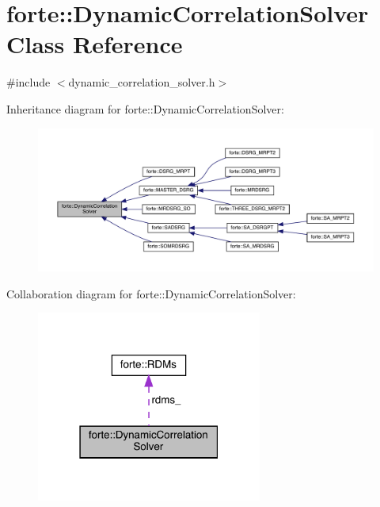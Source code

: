 \hypertarget{classforte_1_1_dynamic_correlation_solver}{}\section{forte\+:\+:Dynamic\+Correlation\+Solver Class Reference}
\label{classforte_1_1_dynamic_correlation_solver}


{\ttfamily \#include $<$dynamic\+\_\+correlation\+\_\+solver.\+h$>$}



Inheritance diagram for forte\+:\+:Dynamic\+Correlation\+Solver\+:
\nopagebreak
\begin{figure}[H]
\begin{center}
\leavevmode
\includegraphics[width=350pt]{classforte_1_1_dynamic_correlation_solver__inherit__graph}
\end{center}
\end{figure}


Collaboration diagram for forte\+:\+:Dynamic\+Correlation\+Solver\+:
\nopagebreak
\begin{figure}[H]
\begin{center}
\leavevmode
\includegraphics[width=210pt]{classforte_1_1_dynamic_correlation_solver__coll__graph}
\end{center}
\end{figure}
